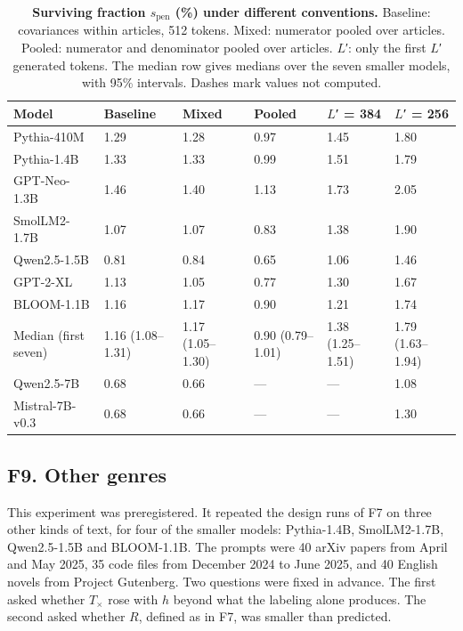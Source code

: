 \documentclass[aps,prx,onecolumn,superscriptaddress,longbibliography]{revtex4-2}
\begin{document}
\begin{table}[htbp]
\centering
\small
\setlength{\tabcolsep}{6pt}
\renewcommand{\thetable}{F11}
\caption{\textbf{Surviving fraction \(s_{\mathrm{pen}}\) (\%) under different conventions.} Baseline: covariances within articles, 512 tokens. Mixed: numerator pooled over articles. Pooled: numerator and denominator pooled over articles. \(L\)′: only the first \(L\)′ generated tokens. The median row gives medians over the seven smaller models, with 95\% intervals. Dashes mark values not computed.}
\label{tabF11}
\begin{tabular}{@{}llllll@{}}
\toprule
Model & Baseline & Mixed & Pooled & \(L\)′ = 384 & \(L\)′ = 256 \\
\midrule
Pythia-410M & 1.29 & 1.28 & 0.97 & 1.45 & 1.80 \\
Pythia-1.4B & 1.33 & 1.33 & 0.99 & 1.51 & 1.79 \\
GPT-Neo-1.3B & 1.46 & 1.40 & 1.13 & 1.73 & 2.05 \\
SmolLM2-1.7B & 1.07 & 1.07 & 0.83 & 1.38 & 1.90 \\
Qwen2.5-1.5B & 0.81 & 0.84 & 0.65 & 1.06 & 1.46 \\
GPT-2-XL & 1.13 & 1.05 & 0.77 & 1.30 & 1.67 \\
BLOOM-1.1B & 1.16 & 1.17 & 0.90 & 1.21 & 1.74 \\
Median (first seven) & 1.16 (1.08--1.31) & 1.17 (1.05--1.30) & 0.90 (0.79--1.01) & 1.38 (1.25--1.51) & 1.79 (1.63--1.94) \\
Qwen2.5-7B & 0.68 & 0.66 & --- & --- & 1.08 \\
Mistral-7B-v0.3 & 0.68 & 0.66 & --- & --- & 1.30 \\
\bottomrule
\end{tabular}
\end{table}


\subsection*{F9. Other genres}

This experiment was preregistered. It repeated the design runs of F7 on three other kinds of text, for four of the smaller models: Pythia-1.4B, SmolLM2-1.7B, Qwen2.5-1.5B and BLOOM-1.1B. The prompts were 40 arXiv papers from April and May 2025, 35 code files from December 2024 to June 2025, and 40 English novels from Project Gutenberg. Two questions were fixed in advance. The first asked whether \(T_{\times}\) rose with \(h\) beyond what the labeling alone produces. The second asked whether \(R\), defined as in F7, was smaller than predicted.
\end{document}
